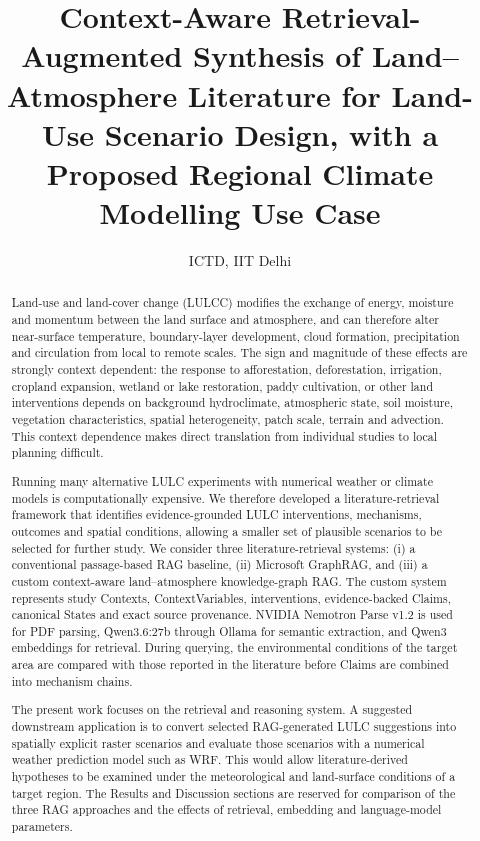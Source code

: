 \documentclass[10pt,twocolumn]{article}
\title{\textbf{Context-Aware Retrieval-Augmented Synthesis of Land--Atmosphere Literature for Land-Use Scenario Design, with a Proposed Regional Climate Modelling Use Case}}
\author{ICTD, IIT Delhi}
\date{}
\begin{document}
\maketitle

\begin{abstract}
Land-use and land-cover change (LULCC) modifies the exchange of energy, moisture and momentum between the land surface and atmosphere, and can therefore alter near-surface temperature, boundary-layer development, cloud formation, precipitation and circulation from local to remote scales. The sign and magnitude of these effects are strongly context dependent: the response to afforestation, deforestation, irrigation, cropland expansion, wetland or lake restoration, paddy cultivation, or other land interventions depends on background hydroclimate, atmospheric state, soil moisture, vegetation characteristics, spatial heterogeneity, patch scale, terrain and advection. This context dependence makes direct translation from individual studies to local planning difficult.

Running many alternative LULC experiments with numerical weather or climate models is computationally expensive. We therefore developed a literature-retrieval framework that identifies evidence-grounded LULC interventions, mechanisms, outcomes and spatial conditions, allowing a smaller set of plausible scenarios to be selected for further study. We consider three literature-retrieval systems: (i) a conventional passage-based RAG baseline, (ii) Microsoft GraphRAG, and (iii) a custom context-aware land--atmosphere knowledge-graph RAG. The custom system represents study Contexts, ContextVariables, interventions, evidence-backed Claims, canonical States and exact source provenance. NVIDIA Nemotron Parse v1.2 is used for PDF parsing, Qwen3.6:27b through Ollama for semantic extraction, and Qwen3 embeddings for retrieval. During querying, the environmental conditions of the target area are compared with those reported in the literature before Claims are combined into mechanism chains.

The present work focuses on the retrieval and reasoning system. A suggested downstream application is to convert selected RAG-generated LULC suggestions into spatially explicit raster scenarios and evaluate those scenarios with a numerical weather prediction model such as WRF. This would allow literature-derived hypotheses to be examined under the meteorological and land-surface conditions of a target region. The Results and Discussion sections are reserved for comparison of the three RAG approaches and the effects of retrieval, embedding and language-model parameters.
\end{abstract}
\end{document}

